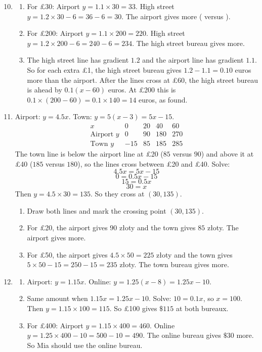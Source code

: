 \documentclass[12pt,a4paper]{article}
\newcommand{\zl}{z\l{}oty}
\newcommand{\heading}[1]{\vspace{8pt}{\large\bfseries #1}\par\vspace{2pt}}
\begin{document}
\heading{Part 4: When do two bureaux give the same amount?}

\begin{enumerate}[label=\textbf{Q\arabic*.}, leftmargin=*]
\setcounter{enumi}{9}
\item
\begin{enumerate}
\item For \pounds30: Airport \(y=1.1\times30=33\). High street \(y=1.2\times30-6=36-6=30\). The airport gives more ( versus ).
\item For \pounds200: Airport \(y=1.1\times200=220\). High street \(y=1.2\times200-6=240-6=234\). The high street bureau gives  more.
\item The high street line has gradient \(1.2\) and the airport line has gradient \(1.1\). So for each extra \pounds1, the high street bureau gives \(1.2-1.1=0.10\) euros more than the airport. After the lines cross at \pounds60, the high street bureau is ahead by \(0.1(x-60)\) euros. At \pounds200 this is \(0.1\times(200-60)=0.1\times140=14\) euros, as found.
\end{enumerate}

\item
Airport: \(y=4.5x\). Town: \(y=5(x-3)=5x-15\).
\[
\begin{array}{c|cccc}
x & 0 & 20 & 40 & 60\\
\hline
\text{Airport }y & 0 & 90 & 180 & 270\\
\text{Town }y & -15 & 85 & 185 & 285
\end{array}
\]
The town line is below the airport line at \pounds20 (\(85\) versus \(90\)) and above it at \pounds40 (\(185\) versus \(180\)), so the lines cross between \pounds20 and \pounds40.
Solve:
\[
4.5x=5x-15
\]
\[
0=0.5x-15
\]
\[
15=0.5x
\]
\[
30=x
\]
Then \(y=4.5\times30=135\). So they cross at \((30,135)\).
\begin{enumerate}
\item Draw both lines and mark the crossing point \((30,135)\).
\item For \pounds20, the airport gives \(90\) \zl{} and the town gives \(85\) \zl{}. The airport gives more.
\item For \pounds50, the airport gives \(4.5\times50=225\) \zl{} and the town gives \(5\times50-15=250-15=235\) \zl{}. The town bureau gives more.
\end{enumerate}

\item
\begin{enumerate}
\item Airport: \(y=1.15x\). Online: \(y=1.25(x-8)=1.25x-10\).
\item Same amount when \(1.15x=1.25x-10\). Solve: \(10=0.1x\), so \(x=100\). Then \(y=1.15\times100=115\). So \pounds100 gives \(\$115\) at both bureaux.
\item For \pounds400: Airport \(y=1.15\times400=460\). Online \(y=1.25\times400-10=500-10=490\). The online bureau gives \(\$30\) more. So Mia should use the online bureau.
\end{enumerate}


\end{enumerate}
\end{document}
